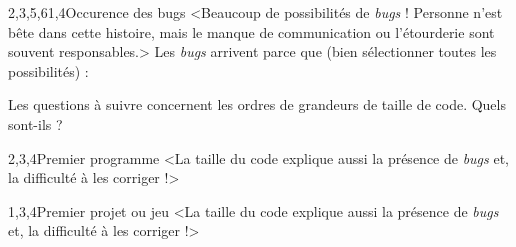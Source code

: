 \begin{quiz}[title={{\itshape Bugs} et bogues}]
\vspace{-\baselineskip}
\begin{quizquestion}[b]{2,3,5,6}{1,4}{Occurence des {\upshape bugs}}
<Beaucoup de possibilités de \textit{bugs} ! Personne n'est bête dans cette histoire, mais le manque de communication ou l'étourderie sont souvent responsables.>
Les \textit{bugs} arrivent parce que (bien sélectionner toutes les possibilités) :
\end{quizquestion}

Les questions à suivre concernent les ordres de grandeurs de taille de code. Quels sont-ils ?

\begin{quizquestion*}[b]{1}{2,3,4}{Premier programme}
<La taille du code explique aussi la présence de \textit{bugs} et, la difficulté à les corriger !>
\end{quizquestion*}


\begin{quizquestion*}[b]{2}{1,3,4}{Premier projet ou jeu}
<La taille du code explique aussi la présence de \textit{bugs} et, la difficulté à les corriger !>
\end{quizquestion*}


\end{quiz}
